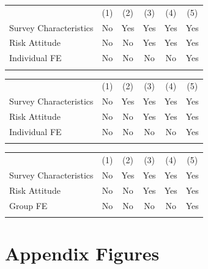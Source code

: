 \documentclass[12pt]{article}
\begin{document}
\begin{table}[htbp]
\center
\begin{tabular}{lccccc}
\toprule \hline
& (1) & (2) & (3) & (4) & (5) \\
Survey Characteristics & No & Yes & Yes & Yes & Yes  \\
Risk Attitude & No & No & Yes & Yes & Yes \\
Individual FE & No & No & No & No & Yes \\ \midrule

\\ \hline \bottomrule
\end{tabular}
\end{table}


\begin{table}[htbp]
\center
\begin{tabular}{lccccc}
\toprule \hline
& (1) & (2) & (3) & (4) & (5) \\
Survey Characteristics & No & Yes & Yes & Yes & Yes  \\
Risk Attitude & No & No & Yes & Yes & Yes \\
Individual FE & No & No & No & No & Yes \\ \midrule

\\ \hline \bottomrule
\end{tabular}
\end{table}


\begin{table}[htbp]
\center
\begin{tabular}{lccccc}
\toprule \hline
& (1) & (2) & (3) & (4) & (5) \\
Survey Characteristics & No & Yes & Yes & Yes & Yes  \\
Risk Attitude & No & No & Yes & Yes & Yes \\
Group FE & No & No & No & No & Yes \\ \midrule

\\ \hline \bottomrule
\end{tabular}
\end{table}

\appendix
\setcounter{table}{0}
\setcounter{figure}{0}
\renewcommand{\thetable}{A\arabic{table}}
\renewcommand{\thefigure}{A\arabic{figure}}

\newpage
\section{Appendix Figures}
\end{document}
